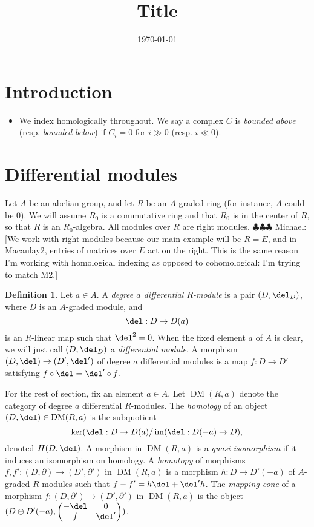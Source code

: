 \documentclass[12pt]{amsart}
\title{Title}
\date{\today}
\theoremstyle{definition}
\newtheorem{defn}[lemma]{Definition}
\theoremstyle{remark}
\newcommand{\im}{\operatorname{im}}
\newcommand{\michael}[1]{{\color{red} \sf $\clubsuit\clubsuit\clubsuit$ Michael: [#1]}}
\def\DM{\operatorname{DM}}
\begin{document}
\maketitle
\tableofcontents

\section{Introduction}




\begin{itemize}
\item We index homologically throughout. We say a complex $C$ is \emph{bounded above} (resp. \emph{bounded below}) if $C_i = 0$ for $i \gg 0$ (resp. $i \ll 0$).
\end{itemize}

\section{Differential modules}

Let $A$ be an abelian group, and let $R$ be an $A$-graded ring (for instance, $A$ could be 0). We will assume $R_0$ is a commutative ring and that $R_0$ is in the center of $R$, so that $R$ is an $R_0$-algebra. All modules over $R$ are right modules. \michael{We work with right modules because our main example will be $R = E$, and in Macaulay2, entries of matrices over $E$ act on the right. This is the same reason I'm working with homological indexing as opposed to cohomological: I'm trying to match M2.} 

\begin{defn}
Let $a \in A$. A \emph{degree $a$ differential $R$-module} is a pair $(D, \del_D)$, where $D$ is an $A$-graded module, and
$$
\del: D \to D(a)
$$
is an $R$-linear map such that $\del^2 = 0$. When the fixed element $a$ of $A$ is clear, we will just call $(D, \del_D)$ a \emph{differential module}. A morphism $(D, \del) \to (D', \del')$ of degree $a$ differential modules is a map $f : D \to D'$ satisfying $f \circ \del = \del' \circ f$. 
\end{defn}

For the rest of section, fix an element $a \in A$. Let $\DM(R,a)$ denote the category of degree $a$ differential $R$-modules. The \emph{homology} of an object $(D, \del) \in \DM(R,a)$ is the subquotient
$$
\ker(\del : D \to D(a) / \im(\del : D(-a) \to D),
$$
denoted $H(D, \del)$. A morphism in $\DM(R, a)$ is a \emph{quasi-isomorphism} if it induces an isomorphism on homology. A \emph{homotopy} of morphisms $f, f' : (D, \partial) \to (D', \partial')$ in $\DM(R, a)$ is a morphism $h : D\to D'(-a)$ of $A$-graded $R$-modules such that $f - f' = h \del + \del' h$. The \emph{mapping cone} of a morphism $f : (D, \partial') \to (D', \partial')$ in $\DM(R, a)$ is the object $(D \oplus D'(-a), \begin{pmatrix} -\del & 0 \\ f & \del' \end{pmatrix})$.
\end{document}
